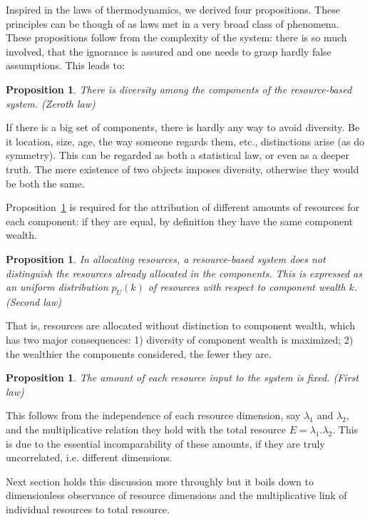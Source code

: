 \documentclass[a4paper, 11pt]{article} %
\newtheorem{proposition}[theorem]{Proposition}
\begin{document}
Inspired in the laws of thermodynamics, we derived four
propositions.
These principles can be though of as laws met in
a very broad class of phenomena.
These propositions follow from the complexity of the system:
there is so much involved, that the ignorance is assured and
one needs to grasp hardly false assumptions. 
This leads to:


\begin{proposition}\label{prop:0}
	There is diversity among the components of the resource-based system. (Zeroth law)
\end{proposition}

If there is a big set of components, there is hardly any way to avoid diversity. Be it location, size, age, the way someone regards them, etc., distinctions arise (as do symmetry). This can be regarded as both a statistical law, or even as a deeper truth.
The mere existence of two objects imposes diversity,
otherwise they would be both the same.

Proposition~\ref{prop:0} is required for the attribution of different amounts of resources for each component:
if they are equal, by definition they have the same component wealth.

\begin{proposition}\label{prop:2}
	In allocating resources, a resource-based system does not distinguish the resources already allocated in the components. This is expressed as an uniform distribution $p_U(k)$ of resources with respect to component wealth $k$. (Second law)
\end{proposition}

That is, resources are allocated without distinction to component wealth, which has two major consequences: 1) diversity of component wealth is maximized; 2) the wealthier the components considered, the fewer they are. 

\begin{proposition}\label{prop:1}
	The amount of each resource input to the system is fixed. (First law)
\end{proposition}

This follows from the independence of each resource dimension,
say $\lambda_1$ and $\lambda_2$, and
the multiplicative relation they hold with the total resource $E=\lambda_1 . \lambda_2$.
This is due to the essential incomparability of these amounts, if they are truly uncorrelated, i.e. different dimensions.

Next section holds this discussion more throughly
but it
boils down to dimensionless observance of resource
dimensions and the multiplicative link of individual resources
to total resource. 
\end{document}
